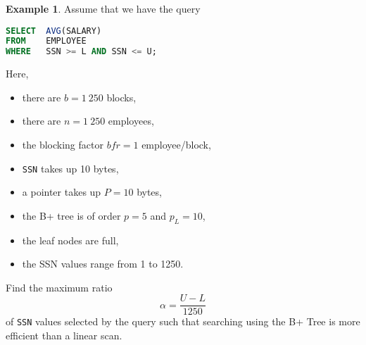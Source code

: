 \documentclass[a4paper, openany]{memoir}
\theoremstyle{definition}
\newtheorem{example}[subsection]{Example}
\begin{document}
\begin{example}
    Assume that we have the query
\begin{lstlisting}[language=SQL]
SELECT  AVG(SALARY) 
FROM    EMPLOYEE 
WHERE   SSN >= L AND SSN <= U;
\end{lstlisting}
    Here,
    \begin{itemize}
        \item there are $b = 1 \ 250$ blocks,
        \item there are $n = 1 \ 250$ employees,
        \item the blocking factor $\textit{bfr} = 1$ employee/block,
        \item \texttt{SSN} takes up 10 bytes,
        \item a pointer takes up $P = 10$ bytes,
        \item the B+ tree is of order $p = 5$ and $p_L = 10$,
        \item the leaf nodes are full,
        \item the SSN values range from 1 to 1250.
    \end{itemize}    
    Find the maximum ratio
    \[\alpha = \frac{U - L}{1250}\] 
    of \texttt{SSN} values selected by the query such that searching using the B+ Tree is more efficient than a linear scan.
\end{example}
\end{document}
